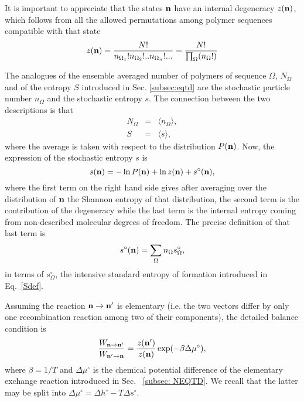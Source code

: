 \documentclass[
	amsmath,
	amssymb,
	a4paper,
	aip,		%
	jcp,		%
	reprint, twocolumn  %
	fleqn,
	showpacs,
	floatfix
]{revtex4-1}
\newcommand{\be}{\begin{equation}}
\newcommand{\ee}{\end{equation}}
\newcommand{\bea}{\begin{eqnarray}}
\newcommand{\eea}{\end{eqnarray}}
\begin{document}
It is important to appreciate that the states $\bold{n}$ have an internal degeneracy $z(\bold{n})$, which follows from all 
the allowed permutations among polymer sequences compatible with that state
\begin{equation}
	\begin{split}
z(\bold{n})=\frac{N!}{n_{\Omega_{1}}!n_{\Omega_{2}}!..n_{\Omega_{n}}!...}=\frac{N!}{\prod_{\Omega}(n_{\Omega}!)}
\label{permut}
\end{split} 
\end{equation}

The analogues of the ensemble averaged number of polymers of sequence $\Omega$, $N_{\Omega}$ and of the entropy $S$ 
introduced in Sec. \ref{subsec:eqtd} are
the stochastic particle number $n_{\Omega}$ and the stochastic entropy $s$. The connection between the two descriptions is that
\bea
N_\Omega &=& \langle n_\Omega \rangle,  \label{avgN} \\
S &=& \langle s \rangle,
\eea
where the average is taken with respect to the distribution $P(\bold{n})$.
Now, the expression of the stochastic entropy $s$ is \citep{Schmiedl2007_vol128}
\be
s(\bold{n})=- \ln P(\bold{n}) +  \ln z(\bold{n}) + s^{\circ}(\bold{n}),
\label{Systent}
\ee
where the first term on the right hand side gives after averaging over the distribution of $\bold{n}$ the Shannon entropy of that distribution,
the second term is the contribution of the degeneracy while the last term is the
internal entropy coming from non-described molecular degrees of freedom. The precise definition of that last term 
is
\be
s^{\circ}(\bold{n})=\sum_\Omega n_\Omega s^{\circ}_\Omega,
\label{S0}
\ee
in terms of $s^{\circ}_{\Omega}$, the intensive standard entropy of formation introduced in Eq.~\eqref{Sdef}.

Assuming the reaction  $\bold{n} \rightarrow \bold{n'}$ is elementary (i.e. the two vectors differ by 
only one recombination reaction among two of their components), the detailed balance condition is
\begin{equation}
\frac{W_{\bold{n} \rightarrow  \bold{n'}} }{W_{\bold{n'} \rightarrow  \bold{n}} }
=\frac{z(\bold{n'})}{z(\bold{n})} \exp(-\beta \Delta \mu^{\circ}),
\label{Fluctheorem}
\end{equation}
where $\beta=1/T$ and $\Delta \mu^{\circ}$ is the chemical potential difference of the elementary exchange reaction 
introduced in Sec. ~\ref{subsec: NEQTD}. We recall that the latter may be split into
$\Delta \mu^{\circ}=\Delta h^{\circ} - T \Delta s^{\circ}$.
\end{document}
